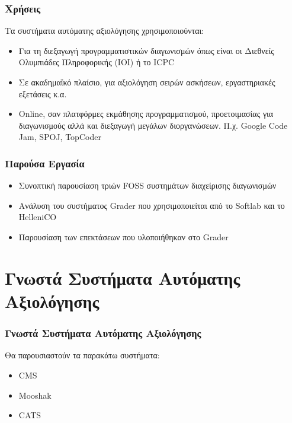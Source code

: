 \documentclass{beamer}
\begin{document}
\begin{frame}
  \frametitle{Χρήσεις}

  Τα συστήματα αυτόματης αξιολόγησης χρησιμοποιούνται:

  \bigskip

  \begin{itemize}
      \item Για τη διεξαγωγή προγραμματιστικών διαγωνισμών όπως είναι οι Διεθνείς
        Ολυμπιάδες Πληροφορικής (IOI) ή το ICPC
      \item Σε ακαδημαϊκό πλαίσιο, για αξιολόγηση σειρών ασκήσεων, εργαστηριακές
        εξετάσεις κ.α.
      \item Online, σαν πλατφόρμες εκμάθησης προγραμματισμού, προετοιμασίας για
        διαγωνισμούς αλλά και διεξαγωγή μεγάλων διοργανώσεων. Π.χ. Google Code Jam,
        SPOJ, TopCoder
  \end{itemize}
\end{frame}


\begin{frame}
  \frametitle{Παρούσα Εργασία}

  \begin{itemize}
      \item Συνοπτική παρουσίαση τριών FOSS συστημάτων διαχείρισης διαγωνισμών
        \bigskip
      \item Ανάλυση του συστήματος Grader που χρησιμοποιείται από το Softlab και το HelleniCO
        \bigskip
      \item Παρουσίαση των επεκτάσεων που υλοποιήθηκαν στο Grader
  \end{itemize}
\end{frame}

\section{Γνωστά Συστήματα Αυτόματης Αξιολόγησης}
\begin{frame}
  \frametitle{Γνωστά Συστήματα Αυτόματης Αξιολόγησης}
  Θα παρουσιαστούν τα παρακάτω συστήματα:

  \bigskip

  \begin{itemize}
      \item CMS
      \item Mooshak
      \item CATS
  \end{itemize}
\end{frame}
\end{document}
